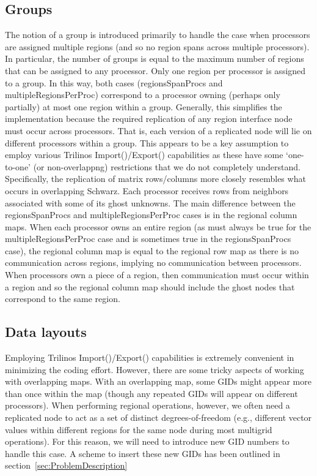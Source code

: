 \documentclass[11pt]{article}
\begin{document}
\subsection{Groups}
The notion of a group is introduced primarily to handle the case when
processors are assigned multiple regions (and so no region spans
across multiple processors). In particular, the number of groups is
equal to the maximum number of regions that can be assigned to
any processor. Only one region per processor is assigned to a group.
In this way, both cases ({\sf regionsSpanProcs} and
{\sf multipleRegionsPerProc}) correspond to a processor owning (perhaps only
partially) at most one region within a group.
Generally, this simplifies the implementation because the required
replication of any region interface node must occur across processors.
That is, each version of a replicated node will lie on different
processors within a group. This appears to be a key assumption to employ various
Trilinos {\sf Import()}/{\sf Export()} capabilities as these have
some `one-to-one' (or non-overlappng) restrictions that we
do not completely understand.
Specifically, the replication of matrix rows/columns more closely
resembles what occurs in overlapping Schwarz. Each processor
receives rows from neighbors associated with some of its ghost
unknowns. The main difference between the {\sf regionsSpanProcs} and
{\sf multipleRegionsPerProc} cases is in the regional column maps.
When each processor owns an entire region (as must always
be true for the {\sf multipleRegionsPerProc} case and is sometimes
true in the {\sf regionsSpanProcs} case), the regional column map is equal
to the regional row map as there is no communication across regions, implying
no communication between processors. When processors own a piece of
a region, then communication must occur within a region and so
the regional column map should include the ghost nodes that correspond
to the same region.

\subsection{Data layouts}
\label{sec:DataLayouts}

Employing Trilinos {\sf Import()}/{\sf Export()} capabilities is extremely convenient
in minimizing the coding effort. However, there are some tricky aspects
of working with overlapping maps. With an overlapping map, some GIDs
might appear more than once within the map (though any repeated GIDs
will appear on different processors). When performing regional
operations, however, we often need a replicated node to act as
a set of distinct degrees-of-freedom (e.g., different vector values within
different regions for the same node during most multigrid operations).
For this reason, we will need to introduce new GID numbers to handle
this case. A scheme to insert these new GIDs has been outlined in section~\ref{sec:ProblemDescription}
\end{document}
